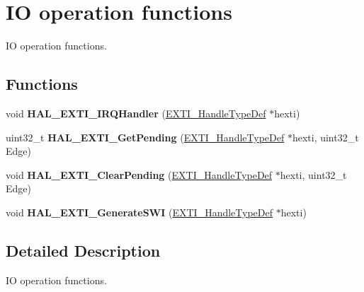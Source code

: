 \hypertarget{group___e_x_t_i___exported___functions___group2}{}\section{IO operation functions}
\label{group___e_x_t_i___exported___functions___group2}


IO operation functions.  


\subsection*{Functions}
\begin{DoxyCompactItemize}
\item 
\mbox{\label{group___e_x_t_i___exported___functions___group2_ga241422a810a8e2aeb0cd8467145d33bb}} 
void {\bfseries H\+A\+L\+\_\+\+E\+X\+T\+I\+\_\+\+I\+R\+Q\+Handler} (\hyperlink{struct_e_x_t_i___handle_type_def}{E\+X\+T\+I\+\_\+\+Handle\+Type\+Def} $\ast$hexti)
\item 
\mbox{\label{group___e_x_t_i___exported___functions___group2_ga96319c70ad567d85105e4608f8b0887e}} 
uint32\+\_\+t {\bfseries H\+A\+L\+\_\+\+E\+X\+T\+I\+\_\+\+Get\+Pending} (\hyperlink{struct_e_x_t_i___handle_type_def}{E\+X\+T\+I\+\_\+\+Handle\+Type\+Def} $\ast$hexti, uint32\+\_\+t Edge)
\item 
\mbox{\label{group___e_x_t_i___exported___functions___group2_gaa99dea85ad2aea36f0abbe022a82664d}} 
void {\bfseries H\+A\+L\+\_\+\+E\+X\+T\+I\+\_\+\+Clear\+Pending} (\hyperlink{struct_e_x_t_i___handle_type_def}{E\+X\+T\+I\+\_\+\+Handle\+Type\+Def} $\ast$hexti, uint32\+\_\+t Edge)
\item 
\mbox{\label{group___e_x_t_i___exported___functions___group2_ga6deebffde84bc80fa9ff1b7faa38615a}} 
void {\bfseries H\+A\+L\+\_\+\+E\+X\+T\+I\+\_\+\+Generate\+S\+WI} (\hyperlink{struct_e_x_t_i___handle_type_def}{E\+X\+T\+I\+\_\+\+Handle\+Type\+Def} $\ast$hexti)
\end{DoxyCompactItemize}


\subsection{Detailed Description}
IO operation functions. 

